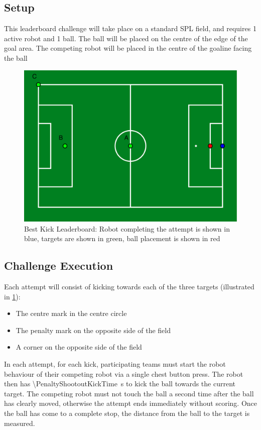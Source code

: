 \subsection{Setup}
This leaderboard challenge will take place on a standard SPL field, and requires 1 active robot and 1 ball.
The ball will be placed on the centre of the edge of the goal area.
The competing robot will be placed in the centre of the goaline facing the ball
\begin{figure}[t]
    \centerline{\includegraphics[width=\columnwidth]{figs/kick_leaderboard.pdf}}
    \caption{Best Kick Leaderboard: Robot completing the attempt is shown in blue, targets are shown in green, ball placement is shown in red}
    \label{fig:kick_leaderboard}
\end{figure}
\subsection{Challenge Execution}
Each attempt will consist of kicking towards each of the three targets (illustrated in \cref{fig:kick_leaderboard}):
\begin{itemize}
    \item The centre mark in the centre circle
    \item The penalty mark on the opposite side of the field
    \item A corner on the opposite side of the field
\end{itemize}
In each attempt, for each kick, participating teams must start the robot behaviour of their competing robot via a single chest button
press. The robot then has \qty{\PenaltyShootoutKickTime}{\second} to kick the ball towards the current target.
The competing robot must not touch the ball a second time after the ball has clearly moved,
otherwise the attempt ends immediately without scoring.
Once the ball has come to a complete stop, the distance from the ball to the target is measured.

